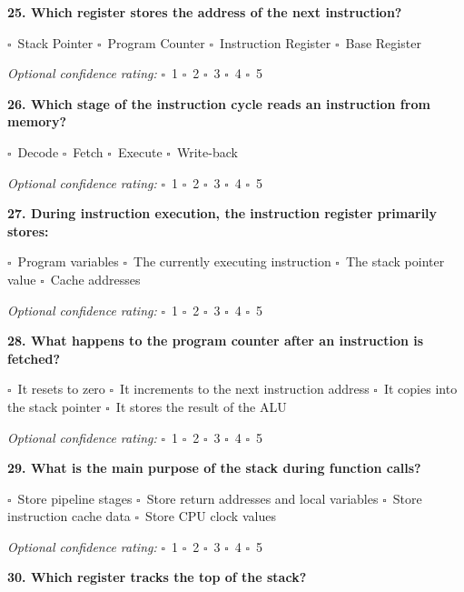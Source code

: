 \documentclass[12pt,a4paper]{article}
\newcommand{\boxmark}{\(\square\)}
\newcommand{\confidenceoptional}{%
    \textit{Optional confidence rating:} \boxmark\ 1 \hspace{1em} \boxmark\ 2 \hspace{1em} \boxmark\ 3 \hspace{1em} \boxmark\ 4 \hspace{1em} \boxmark\ 5
}
\begin{document}
\textbf{25. Which register stores the address of the next instruction?}

\boxmark\ Stack Pointer \hspace{2em}
\boxmark\ Program Counter \hspace{2em}
\boxmark\ Instruction Register \hspace{2em}
\boxmark\ Base Register

\confidenceoptional

\textbf{26. Which stage of the instruction cycle reads an instruction from memory?}

\boxmark\ Decode \hspace{2em}
\boxmark\ Fetch \hspace{2em}
\boxmark\ Execute \hspace{2em}
\boxmark\ Write-back

\confidenceoptional

\textbf{27. During instruction execution, the instruction register primarily stores:}

\boxmark\ Program variables \hspace{1em}
\boxmark\ The currently executing instruction \hspace{1em}
\boxmark\ The stack pointer value \hspace{1em}
\boxmark\ Cache addresses

\confidenceoptional

\textbf{28. What happens to the program counter after an instruction is fetched?}

\boxmark\ It resets to zero \hspace{1em}
\boxmark\ It increments to the next instruction address \hspace{1em}
\boxmark\ It copies into the stack pointer \hspace{1em}
\boxmark\ It stores the result of the ALU

\confidenceoptional

\textbf{29. What is the main purpose of the stack during function calls?}

\boxmark\ Store pipeline stages \hspace{1em}
\boxmark\ Store return addresses and local variables \hspace{1em}
\boxmark\ Store instruction cache data \hspace{1em}
\boxmark\ Store CPU clock values

\confidenceoptional

\textbf{30. Which register tracks the top of the stack?}
\end{document}
